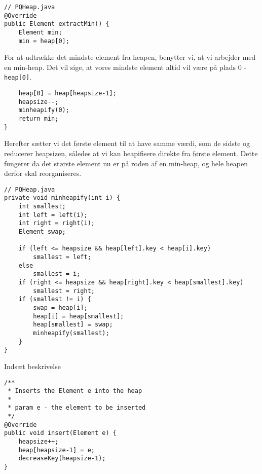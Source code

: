 \documentclass{article}
\begin{document}
\begin{lstlisting}
// PQHeap.java
@Override
public Element extractMin() {
    Element min;
    min = heap[0];    
\end{lstlisting}
For at udtrække det mindste element fra heapen, benytter vi, at vi arbejder med en min-heap. Det vil sige, at vores mindste element altid vil være på plads 0 - \texttt{heap[0]}.
\begin{lstlisting}    
    heap[0] = heap[heapsize-1];
    heapsize--;
    minheapify(0);
    return min;
}
\end{lstlisting}
Herefter sætter vi det første element til at have samme værdi, som de sidste og reducerer heapsizen, således at vi kan heapifisere direkte fra første element. Dette fungerer da det største element nu er på roden af en min-heap, og hele heapen derfor skal reorganiseres.
\begin{lstlisting}
// PQHeap.java
private void minheapify(int i) {
    int smallest;
    int left = left(i);
    int right = right(i);
    Element swap;

    if (left <= heapsize && heap[left].key < heap[i].key)
        smallest = left;
    else
        smallest = i;
    if (right <= heapsize && heap[right].key < heap[smallest].key)
        smallest = right;
    if (smallest != i) {
        swap = heap[i];
        heap[i] = heap[smallest];
        heap[smallest] = swap;
        minheapify(smallest);
    }
}
\end{lstlisting}


Indsæt beskrivelse
\begin{lstlisting}
/**
 * Inserts the Element e into the heap
 *
 * param e - the element to be inserted
 */
@Override
public void insert(Element e) {
    heapsize++;
    heap[heapsize-1] = e;
    decreaseKey(heapsize-1);
}
\end{lstlisting}


\newpage
\end{document}
